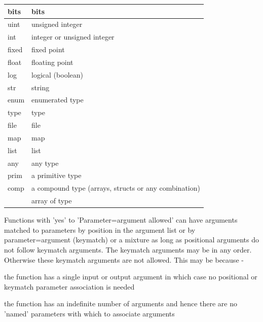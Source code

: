     \begin{tabular}{| l | l |}
    \hline
    bits  & bits                                                    \\ \hline
    uint  & unsigned integer                                        \\ \hline
    int   & integer or unsigned integer                             \\ \hline
    fixed & fixed point                                             \\ \hline
    float & floating point                                          \\ \hline
    log   & logical (boolean)                                       \\ \hline
    str   & string                                                  \\ \hline
    enum  & enumerated type                                         \\ \hline
    type  & type                                                    \\ \hline
    file  & file                                                    \\ \hline
    map   & map                                                     \\ \hline
    list  & list                                                    \\ \hline
    any   & any type                                                \\ \hline
    prim  & a primitive type                                        \\ \hline
    comp  & a compound type (arrays, structs or any combination)    \\ \hline
    []    & array of type                                           \\ \hline
    \end{tabular}

    Functions with 'yes' to 'Parameter=argument allowed' can have arguments
    matched to parameters by position in the argument list or by
    parameter=argument (keymatch) or a mixture as long as positional arguments
    do not follow keymatch arguments. The keymatch arguments may be in
    any order. Otherwise these keymatch arguments are
    not allowed. This may be because - \\
    \blist
    \item   the function has a single input or output argument in which case
    no positional or keymatch parameter association is needed
    \item   the function has an indefinite number of arguments and hence there
    are no 'named' parameters with which to associate arguments
    \blend



